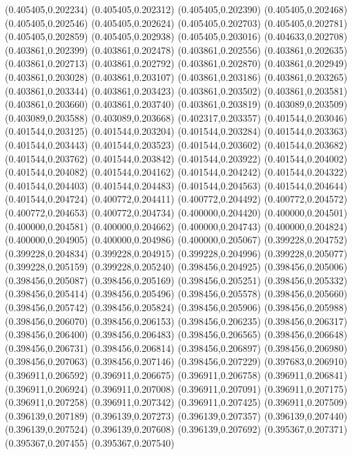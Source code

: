 (0.405405,0.202234)
(0.405405,0.202312)
(0.405405,0.202390)
(0.405405,0.202468)
(0.405405,0.202546)
(0.405405,0.202624)
(0.405405,0.202703)
(0.405405,0.202781)
(0.405405,0.202859)
(0.405405,0.202938)
(0.405405,0.203016)
(0.404633,0.202708)
(0.403861,0.202399)
(0.403861,0.202478)
(0.403861,0.202556)
(0.403861,0.202635)
(0.403861,0.202713)
(0.403861,0.202792)
(0.403861,0.202870)
(0.403861,0.202949)
(0.403861,0.203028)
(0.403861,0.203107)
(0.403861,0.203186)
(0.403861,0.203265)
(0.403861,0.203344)
(0.403861,0.203423)
(0.403861,0.203502)
(0.403861,0.203581)
(0.403861,0.203660)
(0.403861,0.203740)
(0.403861,0.203819)
(0.403089,0.203509)
(0.403089,0.203588)
(0.403089,0.203668)
(0.402317,0.203357)
(0.401544,0.203046)
(0.401544,0.203125)
(0.401544,0.203204)
(0.401544,0.203284)
(0.401544,0.203363)
(0.401544,0.203443)
(0.401544,0.203523)
(0.401544,0.203602)
(0.401544,0.203682)
(0.401544,0.203762)
(0.401544,0.203842)
(0.401544,0.203922)
(0.401544,0.204002)
(0.401544,0.204082)
(0.401544,0.204162)
(0.401544,0.204242)
(0.401544,0.204322)
(0.401544,0.204403)
(0.401544,0.204483)
(0.401544,0.204563)
(0.401544,0.204644)
(0.401544,0.204724)
(0.400772,0.204411)
(0.400772,0.204492)
(0.400772,0.204572)
(0.400772,0.204653)
(0.400772,0.204734)
(0.400000,0.204420)
(0.400000,0.204501)
(0.400000,0.204581)
(0.400000,0.204662)
(0.400000,0.204743)
(0.400000,0.204824)
(0.400000,0.204905)
(0.400000,0.204986)
(0.400000,0.205067)
(0.399228,0.204752)
(0.399228,0.204834)
(0.399228,0.204915)
(0.399228,0.204996)
(0.399228,0.205077)
(0.399228,0.205159)
(0.399228,0.205240)
(0.398456,0.204925)
(0.398456,0.205006)
(0.398456,0.205087)
(0.398456,0.205169)
(0.398456,0.205251)
(0.398456,0.205332)
(0.398456,0.205414)
(0.398456,0.205496)
(0.398456,0.205578)
(0.398456,0.205660)
(0.398456,0.205742)
(0.398456,0.205824)
(0.398456,0.205906)
(0.398456,0.205988)
(0.398456,0.206070)
(0.398456,0.206153)
(0.398456,0.206235)
(0.398456,0.206317)
(0.398456,0.206400)
(0.398456,0.206483)
(0.398456,0.206565)
(0.398456,0.206648)
(0.398456,0.206731)
(0.398456,0.206814)
(0.398456,0.206897)
(0.398456,0.206980)
(0.398456,0.207063)
(0.398456,0.207146)
(0.398456,0.207229)
(0.397683,0.206910)
(0.396911,0.206592)
(0.396911,0.206675)
(0.396911,0.206758)
(0.396911,0.206841)
(0.396911,0.206924)
(0.396911,0.207008)
(0.396911,0.207091)
(0.396911,0.207175)
(0.396911,0.207258)
(0.396911,0.207342)
(0.396911,0.207425)
(0.396911,0.207509)
(0.396139,0.207189)
(0.396139,0.207273)
(0.396139,0.207357)
(0.396139,0.207440)
(0.396139,0.207524)
(0.396139,0.207608)
(0.396139,0.207692)
(0.395367,0.207371)
(0.395367,0.207455)
(0.395367,0.207540)

